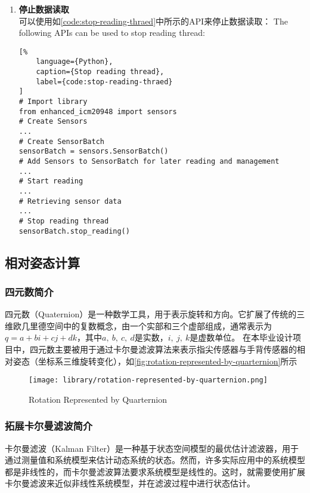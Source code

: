 \begin{enumerate}
\begin{lstlisting}[%
    language={Python},
    caption={Retrieve sensor data},
    label={code:retrieve-sensor-data}
]
# Create SensorBatch
...
# Add Sensors to SensorBatch for later reading and management
...
# Start reading
...
# Retrieving sensor data
# Get accelerometer data
accData = firstSensor.get_accel_data()
# Get gyroscope data
gyroData = firstSensor.get_gyro_data()
# Get magnetometer data
magData = firstSensor.get_mag_data()
\end{lstlisting}
    \item {\bfseries 停止数据读取} \\
可以使用如\autoref{code:stop-reading-thraed}中所示的API来停止数据读取：
The following APIs can be used to stop reading thread:
\begin{lstlisting}[%
    language={Python},
    caption={Stop reading thread},
    label={code:stop-reading-thraed}
]
# Import library
from enhanced_icm20948 import sensors
# Create Sensors
...
# Create SensorBatch
sensorBatch = sensors.SensorBatch()
# Add Sensors to SensorBatch for later reading and management
...
# Start reading
...
# Retrieving sensor data
...
# Stop reading thread
sensorBatch.stop_reading()
\end{lstlisting}
\end{enumerate}

\subsection{相对姿态计算}
\subsubsection{四元数简介}
四元数（Quaternion）是一种数学工具，用于表示旋转和方向。它扩展了传统的三维欧几里德空间中的复数概念，由一个实部和三个虚部组成，通常表示为$ q = a + bi + cj + dk$，其中$a,\ b,\ c,\ d$是实数，$i,\ j,\ k$是虚数单位。
在本毕业设计项目中，四元数主要被用于通过卡尔曼滤波算法来表示指尖传感器与手背传感器的相对姿态（坐标系三维旋转变化），如\autoref{fig:rotation-represented-by-quarternion}所示

\begin{figure}[H]
    \centering
    \texttt{[image: library/rotation-represented-by-quarternion.png]}
    \caption{\label{fig:rotation-represented-by-quarternion}Rotation Represented by Quarternion}
\end{figure}

\subsubsection{拓展卡尔曼滤波简介}
卡尔曼滤波（Kalman Filter）是一种基于状态空间模型的最优估计滤波器，用于通过测量值和系统模型来估计动态系统的状态。然而，许多实际应用中的系统模型都是非线性的，而卡尔曼滤波算法要求系统模型是线性的。这时，就需要使用扩展卡尔曼滤波来近似非线性系统模型，并在滤波过程中进行状态估计。

